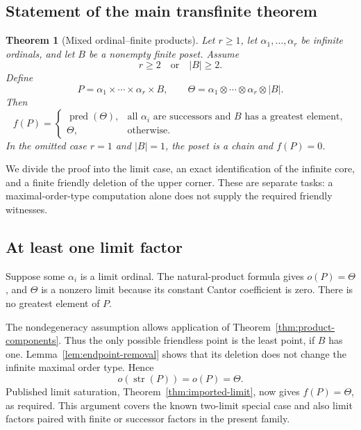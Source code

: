\documentclass[11pt,letterpaper]{article}
\newtheorem{theorem}{Theorem}[section]
\theoremstyle{definition}
\theoremstyle{remark}
\newcommand{\str}{\operatorname{str}}
\newcommand{\pred}{\operatorname{pred}}
\begin{document}
\subsection{Statement of the main transfinite theorem}

\begin{theorem}[Mixed ordinal--finite products]\label{thm:mixed}
Let $r\ge1$, let $\alpha_1,\ldots,\alpha_r$ be infinite ordinals, and let
$B$ be a nonempty finite poset. Assume
\[
 r\ge2\quad\text{or}\quad |B|\ge2.
\]
Define
\[
 P=\alpha_1\times\cdots\times\alpha_r\times B,
 \qquad
 \Theta=\alpha_1\otimes\cdots\otimes\alpha_r\otimes |B|.
\]
Then
\begin{equation}\label{eq:mixed}
 \boxed{
 f(P)=
 \begin{cases}
  \pred(\Theta),&\text{all $\alpha_i$ are successors and $B$ has a greatest element},\\[2pt]
  \Theta,&\text{otherwise}.
 \end{cases}}
\end{equation}
In the omitted case $r=1$ and $|B|=1$, the poset is a chain and $f(P)=0$.
\end{theorem}

We divide the proof into the limit case, an exact identification of the
infinite core, and a finite friendly deletion of the upper corner. These
are separate tasks: a maximal-order-type computation alone does not
supply the required friendly witnesses.

\subsection{At least one limit factor}
Suppose some $\alpha_i$ is a limit ordinal. The natural-product formula
gives $o(P)=\Theta$, and $\Theta$ is a nonzero limit because its constant
Cantor coefficient is zero. There is no greatest element of $P$.

The nondegeneracy assumption allows application of
Theorem~\ref{thm:product-components}. Thus the only possible friendless
point is the least point, if $B$ has one. Lemma~\ref{lem:endpoint-removal}
shows that its deletion does not change the infinite maximal order type.
Hence
\[
 o(\str(P))=o(P)=\Theta.
\]
Published limit saturation, Theorem~\ref{thm:imported-limit}, now gives
$f(P)=\Theta$, as required. This argument covers the known two-limit
special case and also limit factors paired with finite or successor
factors in the present family.
\end{document}
